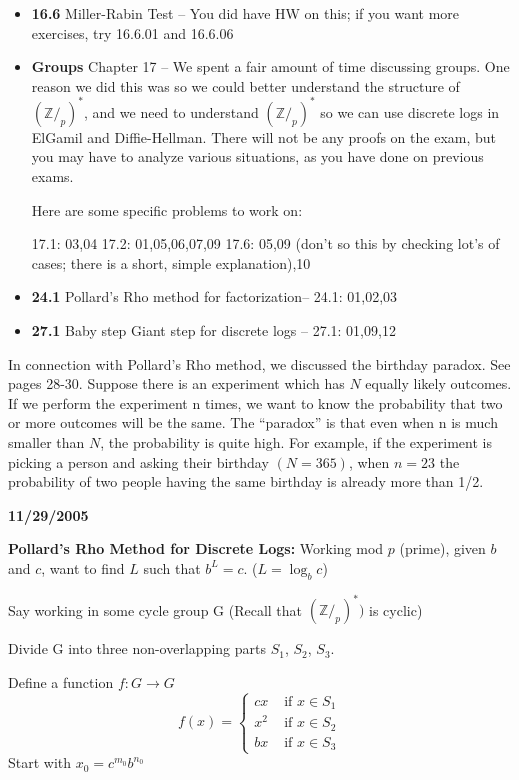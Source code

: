 \begin{itemize}
	\item \textbf{16.6} Miller-Rabin Test --  You did have HW on this; if you want more exercises, try 16.6.01 and 16.6.06
	\item \textbf{Groups} Chapter 17 -- We spent a fair amount of time discussing groups. One reason we did this was so we could better understand the structure of $(\mathbb{Z}/_p)^*$, and we need to understand $(\mathbb{Z}/_p)^*$ so we can use discrete logs in ElGamil and Diffie-Hellman.  There will not be any proofs on the exam, but you may have to analyze various situations, as you have done on previous exams.

Here are some specific problems to work on:

17.1: 03,04
17.2: 01,05,06,07,09
17.6: 05,09 (don't so this by checking lot's of cases; there is a short, simple explanation),10

	\item \textbf{24.1} Pollard's Rho method for factorization-- 24.1:  01,02,03

	\item \textbf{27.1} Baby step Giant step for discrete logs -- 27.1:  01,09,12
\end{itemize}
In connection with Pollard's Rho method, we discussed the birthday paradox.  See pages 28-30.  Suppose there is an experiment which has $N$ equally likely outcomes.  If we perform the experiment n times, we want to know the probability that two or more outcomes will be the same. The ``paradox'' is that even when n is much smaller than $N$, the probability is quite high.  For example, if the experiment is picking a person and asking their birthday $(N=365)$, when $n = 23$ the probability of two people having the same birthday is already more than 1/2.

\textbf{11/29/2005}

\textbf{Pollard's Rho Method for Discrete Logs:} Working mod $p$ (prime), given $b$ and $c$, want to find $L$ such that $b^L = c$. ($L = \log_b{c}$)

Say working in some cycle group G (Recall that $(\mathbb{Z}/_p)^*)$ is cyclic)

Divide G into three non-overlapping parts $S_1$, $S_2$, $S_3$.

Define a function $f:G \rightarrow G$
\[
f(x) = \begin{cases}
cx & \mbox{ if } x \in S_1 \\
x^2 & \mbox{ if } x \in S_2 \\
bx & \mbox{ if } x \in S_3
\end{cases}
\]
Start with $x_0 = c^{m_0}b^{n_0}$

